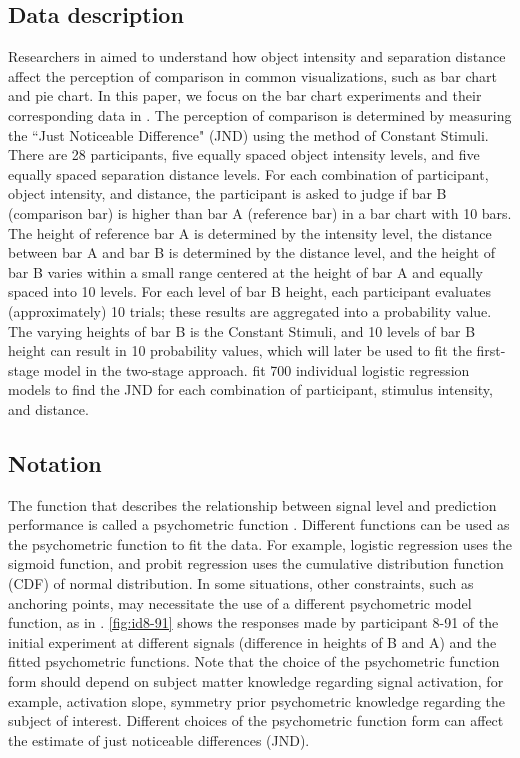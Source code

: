 \subsection{Data description}

Researchers in \cite{JNDVIS21} aimed to understand how object intensity and separation distance affect the perception of comparison in common visualizations, such as bar chart and pie chart. In this paper, we focus on the bar chart experiments and their corresponding data in \cite{JNDVIS21}. 
The perception of comparison is determined by measuring the ``Just Noticeable Difference" (JND) using the method of Constant Stimuli. 
There are 28 participants, five equally spaced object intensity levels, and five equally spaced separation distance levels. 
For each combination of participant, object intensity, and distance, the participant is asked to judge if bar B (comparison bar) is higher than bar A (reference bar) in a bar chart with 10 bars.
The height of reference bar A is determined by the intensity level, the distance between bar A and bar B is determined by the distance level, and the height of bar B varies within a small range centered at the height of bar A and equally spaced into 10 levels. 
For each level of bar B height, each participant evaluates (approximately) 10 trials; these results are aggregated into a probability value.
The varying heights of bar B is the Constant Stimuli, and 10 levels of bar B height can result in 10 probability values, which will later be used to fit the first-stage model in the two-stage approach. 
\cite{JNDVIS21} fit 700 individual logistic regression models to find the JND for each combination of participant, stimulus intensity, and distance.

\subsection{Notation}

The function that describes the relationship between signal level and prediction performance is called a psychometric function \cite{psychophysical}.
Different functions can be used as the psychometric function to fit the data. For example, logistic regression uses the sigmoid function, and probit regression uses the cumulative distribution function (CDF) of normal distribution. 
In some situations, other constraints, such as anchoring points, may necessitate the use of a different psychometric model function, as in \cite{hollands_bias_2000}.
\autoref{fig:id8-91} shows the responses made by participant 8-91 of the initial experiment at different signals (difference in heights of B and A) and the fitted psychometric functions.
Note that the choice of the psychometric function form should depend on subject matter knowledge regarding signal activation, for example, activation slope, symmetry prior psychometric knowledge regarding the subject of interest. Different choices of the psychometric function form can affect the estimate of just noticeable differences (JND).

